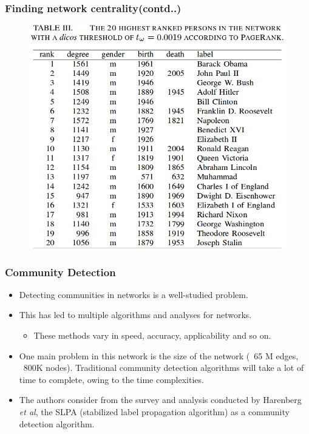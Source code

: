 \documentclass[10pt, compress]{beamer}
\begin{document}
\begin{frame}[fragile]
	\frametitle{Finding network centrality{\small (contd..)}}
\vspace{-5mm}
\begin{figure}
	\centering
    \includegraphics[width=0.7\linewidth]{network-centre.png}
\end{figure}
\end{frame}


\begin{frame}[fragile]
	\frametitle{Community Detection}
\vspace{-5mm}
\begin{itemize}
\item Detecting communities in networks is a well-studied problem.
\item This has led to multiple algorithms and analyses for networks.
\begin{itemize}
	\item These methods vary in speed, accuracy, applicability and so on.
\end{itemize}
\item One main problem in this network is the size of the network (~65 M edges, ~800K nodes). Traditional community detection algorithms will take a lot of time to complete, owing to the time complexities.
\item The authors consider from the survey and analysis conducted by Harenberg \textit{et al}, the SLPA (stabilized label propagation algorithm) as a community detection algorithm.
\end{itemize}
\end{frame}
\end{document}
